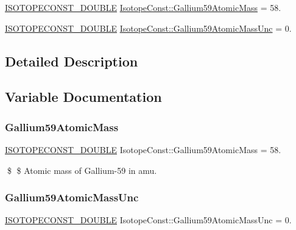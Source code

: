 \begin{DoxyCompactItemize}
\item 
\mbox{\hyperlink{group___isotope_const-_macros_ga8f45a7272ce02c0b4c65c44636ed719a}{I\+S\+O\+T\+O\+P\+E\+C\+O\+N\+S\+T\+\_\+\+D\+O\+U\+B\+LE}} \mbox{\hyperlink{group___isotope_const-_gallium-_ga59_ga9b56948ba3143e7615e8203afd33728b}{Isotope\+Const\+::\+Gallium59\+Atomic\+Mass}} = 58.
\item 
\mbox{\hyperlink{group___isotope_const-_macros_ga8f45a7272ce02c0b4c65c44636ed719a}{I\+S\+O\+T\+O\+P\+E\+C\+O\+N\+S\+T\+\_\+\+D\+O\+U\+B\+LE}} \mbox{\hyperlink{group___isotope_const-_gallium-_ga59_ga1c9a4b5654505d62f96d5435de91df66}{Isotope\+Const\+::\+Gallium59\+Atomic\+Mass\+Unc}} = 0.
\end{DoxyCompactItemize}


\subsection{Detailed Description}


\subsection{Variable Documentation}
\mbox{\label{group___isotope_const-_gallium-_ga59_ga9b56948ba3143e7615e8203afd33728b}} 
\subsubsection{\texorpdfstring{Gallium59\+Atomic\+Mass}{Gallium59AtomicMass}}
{\footnotesize\ttfamily \mbox{\hyperlink{group___isotope_const-_macros_ga8f45a7272ce02c0b4c65c44636ed719a}{I\+S\+O\+T\+O\+P\+E\+C\+O\+N\+S\+T\+\_\+\+D\+O\+U\+B\+LE}} Isotope\+Const\+::\+Gallium59\+Atomic\+Mass = 58.}

\$ \$ Atomic mass of Gallium-\/59 in amu. \mbox{\label{group___isotope_const-_gallium-_ga59_ga1c9a4b5654505d62f96d5435de91df66}} 
\subsubsection{\texorpdfstring{Gallium59\+Atomic\+Mass\+Unc}{Gallium59AtomicMassUnc}}
{\footnotesize\ttfamily \mbox{\hyperlink{group___isotope_const-_macros_ga8f45a7272ce02c0b4c65c44636ed719a}{I\+S\+O\+T\+O\+P\+E\+C\+O\+N\+S\+T\+\_\+\+D\+O\+U\+B\+LE}} Isotope\+Const\+::\+Gallium59\+Atomic\+Mass\+Unc = 0.}

